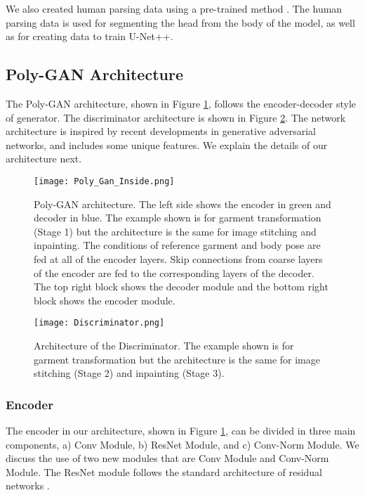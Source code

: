 \documentclass[11pt]{article}
\begin{document}
We also created human parsing data using a pre-trained method \citet{MULA} \citet{Pytorch-MULA}. The human parsing data is used for segmenting the head from the body of the model, as well as for creating data to train U-Net++.


\subsection{Poly-GAN Architecture}
The Poly-GAN architecture, shown in Figure \ref{fig:4}, follows the encoder-decoder style of generator.
The discriminator architecture is shown in Figure \ref{fig:5}.
The network architecture is inspired by recent developments in generative adversarial networks, and includes some unique features. We explain the details of our architecture next.

\begin{figure}
\centering
  \texttt{[image: Poly\_Gan\_Inside.png]}
  \caption{Poly-GAN architecture. The left side shows the encoder in green and decoder in blue. The example shown is for garment transformation (Stage 1) but the architecture is the same for image stitching and inpainting. The conditions of reference garment and body pose are fed at all of the encoder layers. Skip connections from coarse layers of the encoder are fed to the corresponding layers of the decoder. The top right block shows the decoder module and the bottom right block shows the encoder module. }
  \label{fig:4}
\end{figure}
\begin{figure}
\begin{center}
  \texttt{[image: Discriminator.png]}
  \caption{Architecture of the Discriminator. The example shown is for garment transformation but the architecture is the same for image stitching (Stage 2) and inpainting (Stage 3). }
  \label{fig:5}
\end{center}
\end{figure}
\subsubsection{Encoder}
The encoder in our architecture, shown in Figure \ref{fig:4}, can be divided in three main components, a) Conv Module, b) ResNet Module, and c) Conv-Norm Module. 
We discuss the use of two new modules that are Conv Module and Conv-Norm Module. The ResNet module follows the standard architecture of residual networks \citet{Resnet}.
\end{document}
